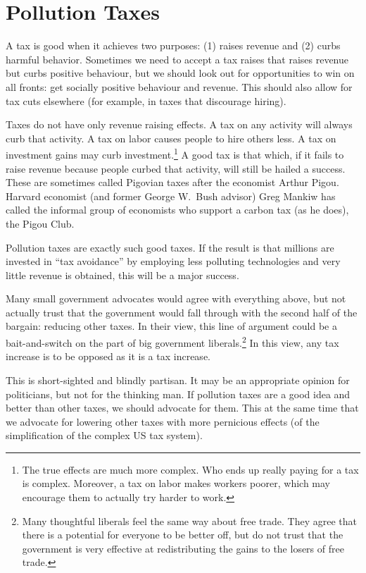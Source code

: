 
\section{Pollution Taxes}

A tax is good when it achieves two purposes: (1) raises revenue and (2) curbs
harmful behavior. Sometimes we need to accept a tax raises that raises revenue
but curbs positive behaviour, but we should look out for opportunities to win
on all fronts: get socially positive behaviour and revenue. This should also
allow for tax cuts elsewhere (for example, in taxes that discourage hiring).

Taxes do not have only revenue raising effects. A tax on any activity will
always curb that activity. A tax on labor causes people to hire others
less. A tax on investment gains may curb investment.\footnote{The true effects
are much more complex. Who ends up really paying for a tax is complex.
Moreover, a tax on labor makes workers poorer, which may encourage them to
actually try harder to work.} A good tax is that which, if it fails to raise
revenue because people curbed that activity, will still be hailed a success.
These are sometimes called Pigovian taxes after the economist Arthur Pigou.
Harvard economist (and former George W.\ Bush advisor) Greg Mankiw has called
the informal group of economists who support a carbon tax (as he does), the
Pigou Club.

Pollution taxes are exactly such good taxes. If the result is that millions are
invested in ``tax avoidance'' by employing less polluting technologies and very
little revenue is obtained, this will be a major success.

Many small government advocates would agree with everything above, but not
actually trust that the government would fall through with the second half of
the bargain: reducing other taxes. In their view, this line of argument could
be a bait-and-switch on the part of big government liberals.\footnote{Many
thoughtful liberals feel the same way about free trade. They agree that there
is a potential for everyone to be better off, but do not trust that the
government is very effective at redistributing the gains to the losers of free
trade.} In this view, any tax increase is to be opposed as it is a tax
increase.

This is short-sighted and blindly partisan. It may be an appropriate opinion
for politicians, but not for the thinking man. If pollution taxes are a good
idea and better than other taxes, we should advocate for them. This at the same
time that we advocate for lowering other taxes with more pernicious effects (of
the simplification of the complex US tax system).

